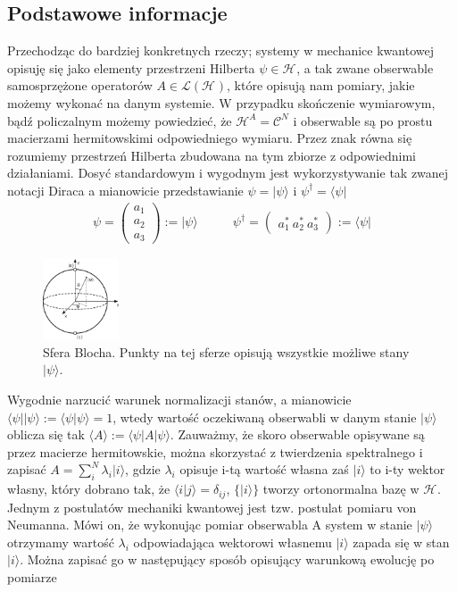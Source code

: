 \documentclass[10pt]{article} %
\newcommand{\Mats}[1]{\mathcal{L}(#1)}
\newcommand{\Hx}[1]{\mathcal{H}^{#1}}
\newcommand{\LHx}[1]{\Mats{\Hx{#1}}}
\newcommand{\Ket}[1]{|#1\rangle}
\newcommand{\Bra}[1]{\langle#1|}
\newcommand{\Braket}[1]{\langle#1\rangle}
\newcommand{\KP}{\Ket{\psi}}
\begin{document}
\subsection{Podstawowe informacje}
Przechodząc do bardziej konkretnych rzeczy; systemy w mechanice kwantowej opisuję się jako elementy przestrzeni Hilberta $\psi \in \Hx{}$, a tak zwane obserwable samosprzężone operatorów $A \in \LHx{}$, które opisują nam pomiary, jakie możemy wykonać na danym systemie. W przypadku skończenie wymiarowym, bądź policzalnym możemy powiedzieć, że $\Hx{A} = \mathcal{C}^N$ i
obserwable są po prostu macierzami hermitowskimi odpowiedniego wymiaru. Przez znak równa się rozumiemy przestrzeń Hilberta zbudowana na tym zbiorze z odpowiednimi działaniami. Dosyć standardowym i wygodnym jest wykorzystywanie tak zwanej notacji Diraca a mianowicie przedstawianie $\psi = \Ket{\psi}$ i $\psi^\dag = \Bra{\psi}$
\begin{align}
\psi = 
\begin{pmatrix}
a_1\\a_2\\a_3
\end{pmatrix}
:= \Ket{\psi}
\quad & \quad\psi^\dag = 
\begin{pmatrix}
a_1^*~a_2^*~a_3^*
\end{pmatrix}
:= \Bra{\psi}
\end{align}
\begin{figure}[th]
\centering
\includegraphics[width=0.20\textwidth]{obrazki/Bloch_sphere}
\caption{Sfera Blocha. Punkty na tej sferze opisują wszystkie możliwe stany $\KP$.}
\label{fig:bloch}
\end{figure}
Wygodnie narzucić warunek normalizacji stanów, a mianowicie $\Bra{\psi}\Ket{\psi} := \Braket{\psi|\psi} = 1$, wtedy wartość oczekiwaną obserwabli w danym stanie $\Ket{\psi}$ oblicza się tak $\Braket{A} := \Bra{\psi}A\Ket{\psi}$. Zauważmy, że skoro obserwable opisywane są przez macierze hermitowskie, można 
skorzystać z twierdzenia spektralnego i zapisać $A = \sum_i^N \lambda_i \Ket{i}$, gdzie $\lambda_i$ opisuje i-tą wartość własna zaś $\Ket{i}$ to i-ty wektor własny, który dobrano tak, że $\Braket{i|j} = \delta_{ij}$, $\{\Ket{i}\}$ tworzy ortonormalna bazę w $\Hx{}$. Jednym z postulatów mechaniki kwantowej jest tzw. postulat pomiaru von Neumanna. Mówi on, że wykonując pomiar obserwabla A system w stanie $\Ket{\psi}$ otrzymamy wartość $\lambda_i$ odpowiadająca wektorowi własnemu $\Ket{i}$ zapada się w stan $\Ket{i}$. Można zapisać go w następujący sposób opisujący warunkową ewolucję po pomiarze
\end{document}
